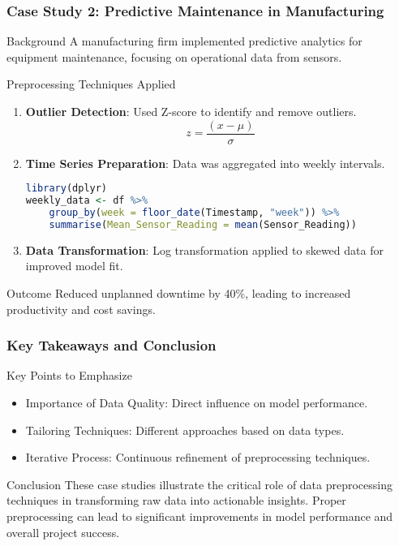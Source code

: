 \documentclass[aspectratio=169]{beamer}
\begin{document}
\begin{frame}[fragile]
    \frametitle{Case Study 2: Predictive Maintenance in Manufacturing}
    
    \begin{block}{Background}
        A manufacturing firm implemented predictive analytics for equipment maintenance, focusing on operational data from sensors.
    \end{block}

    \begin{block}{Preprocessing Techniques Applied}
        \begin{enumerate}
            \item \textbf{Outlier Detection}: Used Z-score to identify and remove outliers.
            \begin{equation}
                z = \frac{(x - \mu)}{\sigma}
            \end{equation}
            \item \textbf{Time Series Preparation}: Data was aggregated into weekly intervals.
            \begin{lstlisting}[language=R]
library(dplyr)
weekly_data <- df %>%
    group_by(week = floor_date(Timestamp, "week")) %>%
    summarise(Mean_Sensor_Reading = mean(Sensor_Reading))
            \end{lstlisting}
            \item \textbf{Data Transformation}: Log transformation applied to skewed data for improved model fit.
        \end{enumerate}
    \end{block}
    
    \begin{block}{Outcome}
        Reduced unplanned downtime by 40\%, leading to increased productivity and cost savings.
    \end{block}
\end{frame}

\begin{frame}[fragile]
    \frametitle{Key Takeaways and Conclusion}
    
    \begin{block}{Key Points to Emphasize}
        \begin{itemize}
            \item Importance of Data Quality: Direct influence on model performance.
            \item Tailoring Techniques: Different approaches based on data types.
            \item Iterative Process: Continuous refinement of preprocessing techniques.
        \end{itemize}
    \end{block}
    
    \begin{block}{Conclusion}
        These case studies illustrate the critical role of data preprocessing techniques in transforming raw data into actionable insights. Proper preprocessing can lead to significant improvements in model performance and overall project success.
    \end{block}
\end{frame}
\end{document}
